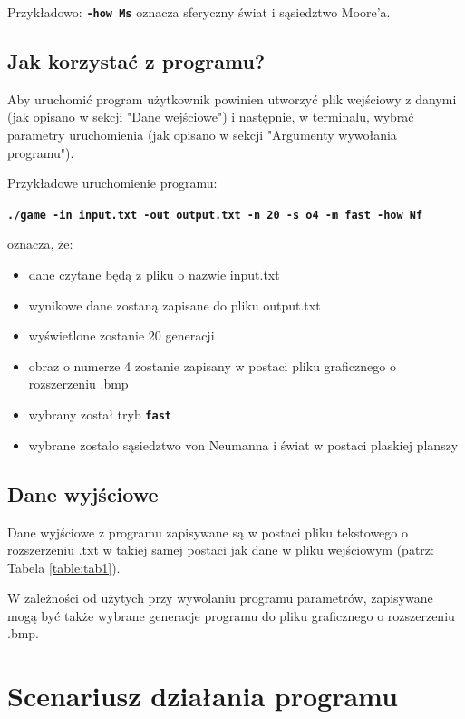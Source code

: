 \documentclass[a4paper]{article}
\begin{document}
\begin{itemize}
\begin{itemize}
				

				Przyk\l{}adowo: \texttt{\textbf{-how Ms}} oznacza sferyczny \'swiat i s\k{a}siedztwo Moore'a.
		\end{itemize}

\end{itemize}

\subsection{Jak korzysta\'c z programu?}
\quad Aby uruchomi\'c program u\.zytkownik powinien utworzy\'c plik wej\'sciowy z danymi (jak opisano w sekcji "Dane wej\'sciowe") i nast\k{e}pnie, w terminalu, wybra\'c parametry uruchomienia (jak opisano w sekcji "Argumenty wywo\l{}ania programu").

Przyk\l{}adowe uruchomienie programu:
\begin{center}
	\texttt{\textbf{./game -in input.txt -out output.txt -n 20 -s o4 -m fast -how Nf}}
\end{center}
oznacza, \.ze:
\begin{itemize}
	\item dane czytane b\k{e}d\k{a} z pliku o nazwie input.txt
	\item wynikowe dane zostan\k{a} zapisane do pliku output.txt
	\item wy\'swietlone zostanie 20 generacji
	\item obraz o numerze 4 zostanie zapisany w postaci pliku graficznego o rozszerzeniu .bmp
	\item wybrany zosta\l{} tryb \texttt{\textbf{fast}}
	\item wybrane zosta\l{}o s\k{a}siedztwo von Neumanna i \'swiat w postaci plaskiej planszy
\end{itemize}

\subsection{Dane wyj\'sciowe}
\quad Dane wyj\'sciowe z programu zapisywane s\k{a} w postaci pliku tekstowego o rozszerzeniu .txt w takiej samej postaci jak dane w pliku wej\'sciowym (patrz: Tabela \ref{table:tab1}).

W zale\.zno\'sci od u\.zytych przy wywolaniu programu parametr\'ow, zapisywane mog\k{a} by\'c tak\.ze wybrane generacje programu do pliku graficznego o rozszerzeniu .bmp.

\section{Scenariusz dzia\l{}ania programu}
\end{document}
